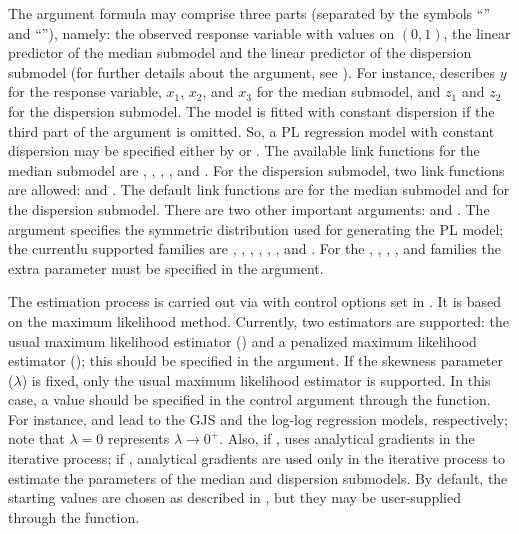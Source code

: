 The argument formula may comprise three parts (separated by the symbols ``\code{~}'' and ``\code{|}''), namely: the observed response variable with values on $(0,1)$, the linear predictor of the median submodel and the linear  predictor of the dispersion submodel (for further details about the  argument, see \cite{ZeileisCroissant2010}). For instance,    describes $y$ for the response variable, $x_1$, $x_2$, and $x_3$ for the median submodel, and $z_1$ and $z_2$ for the dispersion submodel. The model is fitted with constant dispersion if the third part of the argument  is omitted. So, a PL regression model with constant dispersion may be specified either by  or . The available link functions for the median submodel are , , , , and . For the dispersion submodel, two link functions are allowed:  and . The default link functions are  for the median submodel and  for the dispersion submodel. There are two other important arguments:  and . The argument  specifies the symmetric distribution used for generating the PL model; the currentlu supported families are , , , , , , and . For the , , , , and  families the extra parameter must be specified in the  argument.

The estimation process is carried out via  with control options set in . It is based on the maximum likelihood method. Currently, two estimators are supported: the usual maximum likelihood estimator () and a penalized maximum likelihood estimator (); this should be specified in the  argument. If the skewness parameter ($\lambda$) is fixed, only the usual maximum likelihood estimator is supported. In this case, a value should be specified in the control argument through the  function. For instance,  and  lead to the GJS and the log-log regression models, respectively; note that $\lambda=0$ represents $\lambda \to 0^+$. Also, if ,  uses analytical gradients in the iterative process; if , analytical gradients are used only in the iterative process to estimate the parameters of the median and dispersion submodels. By default, the starting values are chosen as described in \cite{QueirozFerrari2023}, but they may be user-supplied through the  function. 

